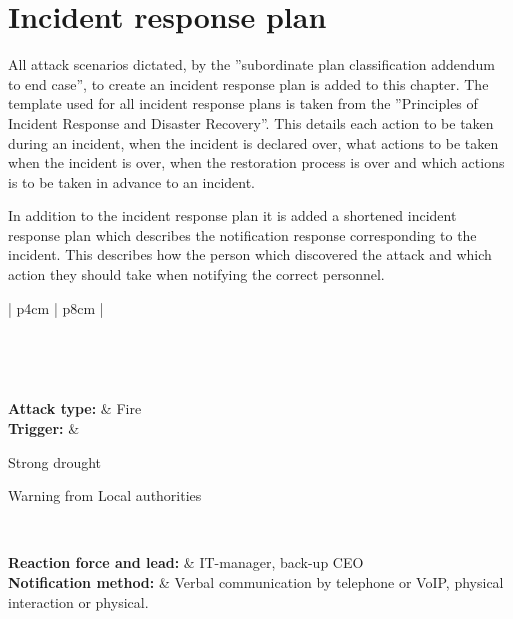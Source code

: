 \section{Incident response plan}

All attack scenarios dictated, by the ”subordinate plan classification addendum to end case”, to create an incident response plan is added to this chapter. The template used for all incident response plans is taken from the ”Principles of Incident Response and Disaster Recovery”. This details each action to be taken during an incident, when the incident is declared over, what actions to be taken when the incident is over, when the restoration process is over and which actions is to be taken in advance to an incident.

In addition to the incident response plan it is added a shortened incident response plan which describes the notification response corresponding to the incident. This describes how the person which discovered the attack and which action they should take when notifying the correct personnel.

\begin{longtable}{| p{4cm} | p{8cm} |}
	\hline {}\\\hline
	\hline {}
	\endfirsthead
	
	\hline {}\\\hline
	\hline {}
	\endhead
	
	\\\hline
	\endfoot
	
	\endlastfoot
	
	\textbf{Attack type:} & Fire \\\hline
	\textbf{Trigger:} & 
	\begin{description}
	\item Strong drought
	\item Warning from Local authorities
	\item
	\end{description} \\\hline
	
	\textbf{Reaction force and lead:} & IT-manager, back-up CEO \\\hline
	\textbf{Notification method:} & Verbal communication by telephone or VoIP, physical interaction or physical. \\\hline
	
	
	
					
\end{longtable}